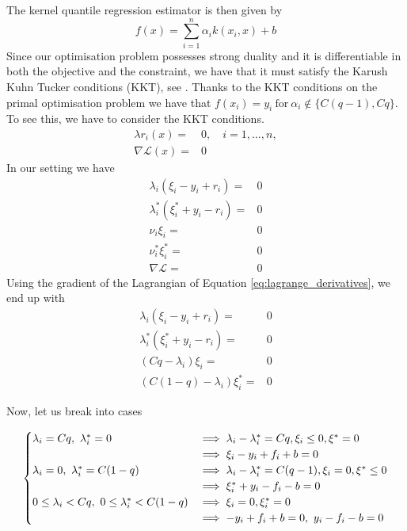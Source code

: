 The kernel quantile regression estimator is then given by
\begin{equation}
    f(x)=\sum\limits_{i=1}^{n} \alpha_i k(x_i, x)+b
\end{equation}
Since our optimisation problem possesses strong duality and it is differentiable in both the objective and the constraint, we have that it must satisfy the Karush Kuhn Tucker conditions (KKT), see \cite[Section 5.5.3]{boyd2004convex}.
Thanks to the KKT conditions on the primal optimisation problem we have that $f(x_i)=y_i \ \mathrm{for} \ \alpha_i \not \in \{C(q-1), Cq\}$. 
To see this, we have to consider the KKT conditions.
\begin{equation}
    \begin{aligned}
    \lambda r_i(x)=&0, \quad i=1,\dots,n,
    \\
    \nabla \mathcal{L}(x)=&0
\end{aligned}
\end{equation}
In our setting we have
\begin{equation}
    \begin{aligned}
        \lambda_i(\xi_i-y_i+r_i)=&0
        \\
        \lambda_i^*(\xi_i^*+y_i-r_i)=&0
        \\
        \nu_i \xi_i=&0
        \\
        \nu_i^* \xi_i^*=&0
        \\
        \nabla \mathcal{L} =&0
    \end{aligned}
\end{equation}
Using the gradient of the Lagrangian of Equation \ref{eq:lagrange_derivatives}, we end up with
\begin{equation}
    \begin{aligned}
        \lambda_i(\xi_i-y_i+r_i)=&0
        \\
        \lambda_i^*(\xi_i^*+y_i-r_i)=&0
        \\
        (Cq-\lambda_i) \xi_i=&0
        \\
        (C(1-q)-\lambda_i) \xi_i^*=&0
    \end{aligned}
\end{equation}

Now, let us break into cases

\begin{equation}
\begin{cases}
    \lambda_i=Cq, \ \lambda_i^*=0 & 
    \hbox{$\implies \lambda_i-\lambda_i^*=Cq, \xi_i\leq 0, \xi^*=0$}
    \\
    &
    \hbox{$\implies \xi_i-y_i+f_i+b=0$}
    \\
    \lambda_i=0, \ \lambda_i^*=C(1-q) & 
    \hbox{$\implies \lambda_i-\lambda_i^*=C(q-1), \xi_i= 0, \xi^*\leq 0$} 
    \\
    & \hbox{$ \implies \xi_i^*+y_i-f_i-b=0$}
    \\
    0\leq \lambda_i< Cq, \ 0\leq \lambda_i^*< C(1-q) & 
    \hbox{$\implies \xi_i=0,  \xi^*_i= 0$}
    \\
    & \hbox{$\implies -y_i+f_i+b=0, \ y_i-f_i-b=0$} \\
\end{cases}
\end{equation}

